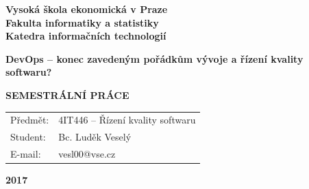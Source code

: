 \documentclass[FM,DP]{tulthesis}
\begin{document}

{\thispagestyle{empty}

\begin{center}
\bfseries
\LARGE
Vysok\'a \v skola ekonomick\'a v Praze\\ 
\vspace{3mm}
\Large
Fakulta informatiky a statistiky\\\vspace{1mm}
\vspace{1mm}
Katedra informa\v cn\'ich technologi\'i
\vspace{3cm}
\end{center}

\vfill

\begin{center}
\Huge\bfseries
DevOps -- konec zavedeným pořádkům vývoje a řízení kvality softwaru?
\par
\vspace{15mm}
\end{center}

\begin{center}
\Large\bfseries
\MakeUppercase{Semestrální práce}
\vspace{3cm}
\end{center}

\vfill

\list{}{\leftmargin=2.7cm}\item[]
\large\noindent\begin{tabularx}{\linewidth}{@{}lX@{}}
\color{tulgray}%
Předmět: & 4IT446 -- Řízení kvality softwaru \\
\color{tulgray}%
Student: & Bc. Luděk Veselý \\
\color{tulgray}%
E-mail: & vesl00@vse.cz \\
\end{tabularx}
\endlist
\list{}{\leftmargin=-3.1cm}\item[]
\endlist

\vfill

\begin{center}
\Large\bfseries
2017
\end{center}

\vspace*{-1cm}
\cleardoublepage}


\setcounter{page}{2}
\tableofcontents
\clearpage

%
%
\end{document}

